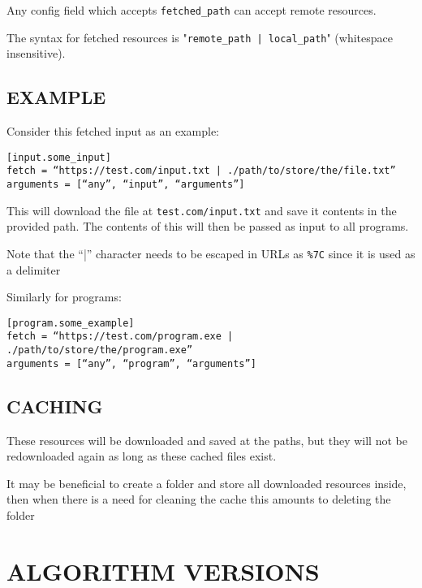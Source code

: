 \documentclass[a4paper,english]{article}
\begin{document}
\begin{adjustwidth}{18pt}{0pt}
        Any config field which accepts \texttt{fetched\_path} can accept remote resources.

        The syntax for fetched resources is "\texttt{remote\_path | local\_path}"
        (whitespace insensitive).

        \subsection{EXAMPLE}

            Consider this fetched input as an example:

            \begin{verbatim}
[input.some_input]
fetch = “https://test.com/input.txt | ./path/to/store/the/file.txt”
arguments = [“any”, “input”, “arguments”]
            \end{verbatim}
            This will download the file at \texttt{test.com/input.txt} and save it
            contents in the provided path.
            The contents of this will then be passed as input to all programs.

            Note that the “|” character needs to be escaped in URLs as
            \texttt{\%7C} since it is used as a delimiter

            Similarly for programs:

            \begin{verbatim}
[program.some_example]
fetch = “https://test.com/program.exe | ./path/to/store/the/program.exe”
arguments = [“any”, “program”, “arguments”]
            \end{verbatim}

        \subsection{CACHING}

            These resources will be downloaded and saved at the paths, but they will
            not be redownloaded again as long as these cached files exist.

            It may be beneficial to create a folder and store all downloaded resources
            inside, then when there is a need for cleaning the cache this amounts
            to deleting the folder

    \section{ALGORITHM VERSIONS}


\end{adjustwidth}
\end{document}
